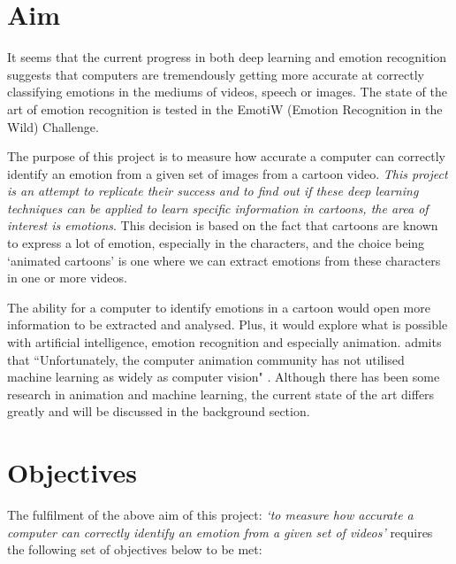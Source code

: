 \documentclass[report, 11pt, oneside]{dissertation}
\begin{document}
\section{Aim}

It seems that the current progress in both deep learning and emotion recognition suggests that computers are tremendously getting more accurate at correctly classifying emotions in the mediums of videos, speech or images. The state of the art of emotion recognition is tested in the EmotiW (Emotion Recognition in the Wild) Challenge. 

The purpose of this project is to measure how accurate a computer can correctly identify an emotion from a given set of images from a cartoon video. \textit{This project is an attempt to replicate their success and to find out if these deep learning techniques can be applied to learn specific information in cartoons, the area of interest is emotions}. This decision is based on the fact that cartoons are known to express a lot of emotion, especially in the characters, and the choice being `animated cartoons' is one where we can extract emotions from these characters in one or more videos.

The ability for a computer to identify emotions in a cartoon would open more information to be extracted and analysed. Plus, it would explore what is possible with artificial intelligence, emotion recognition and especially animation. \citep{wang:2017} admits that ``Unfortunately, the computer animation community has not utilised machine learning as widely as computer vision" \citep[3]{wang:2017}. Although there has been some research in animation and machine learning, the current state of the art differs greatly and will be discussed in the background section.

\section{Objectives}

The fulfilment of the above aim of this project: \textit{`to measure how accurate a computer can correctly identify an emotion from a given set of videos'} requires the following set of objectives below to be met:
\end{document}
